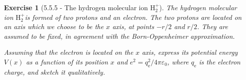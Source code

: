\documentclass[12pt]{article}
\newtheorem{exercise}{Exercise}
\begin{document}
	\begin{exercise}[5.5.5 - The hydrogen molecular ion $\mathrm{H}_{2}^{+}$]
		The hydrogen molecular ion $\mathrm{H}_{2}^{+}$is formed of two protons and an electron. The two protons are located on an axis which we choose to be the $x$ axis, at points $-r / 2$ and $r / 2$. They are assumed to be fixed, in agreement with the Born-Oppenheimer approximation.
		\begin{exercises}
			\item Assuming that the electron is located on the $x$ axis, express its potential energy $V(x)$ as a function of its position $x$ and $e^{2}=q_{\mathrm{e}}^{2} / 4 \pi \varepsilon_{0}$, where $q_{\mathrm{e}}$ is the electron charge, and sketch it qualitatively.
			\begin{multianswer}
				
			\end{multianswer}
			
		\end{exercises}
	\end{exercise}
	
\end{document}
